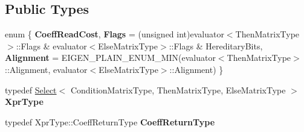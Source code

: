 \subsection*{Public Types}
\begin{DoxyCompactItemize}
\item 
\mbox{\label{struct_eigen_1_1internal_1_1evaluator_3_01_select_3_01_condition_matrix_type_00_01_then_matrix_t0c555ecce04e199df0b1ebada3749ccc_a7ffdf9db02ba05c1f4eb03e3d3ef8279}} 
enum \{ {\bfseries Coeff\+Read\+Cost}, 
{\bfseries Flags} = (unsigned int)evaluator$<$Then\+Matrix\+Type$>$\+::Flags \& evaluator$<$Else\+Matrix\+Type$>$\+::Flags \& Hereditary\+Bits, 
{\bfseries Alignment} = E\+I\+G\+E\+N\+\_\+\+P\+L\+A\+I\+N\+\_\+\+E\+N\+U\+M\+\_\+\+M\+IN(evaluator$<$Then\+Matrix\+Type$>$\+::Alignment, evaluator$<$Else\+Matrix\+Type$>$\+::Alignment)
 \}
\item 
\mbox{\label{struct_eigen_1_1internal_1_1evaluator_3_01_select_3_01_condition_matrix_type_00_01_then_matrix_t0c555ecce04e199df0b1ebada3749ccc_a78436c5edc9cca577b62054c11c57e19}} 
typedef \mbox{\hyperlink{class_eigen_1_1_select}{Select}}$<$ Condition\+Matrix\+Type, Then\+Matrix\+Type, Else\+Matrix\+Type $>$ {\bfseries Xpr\+Type}
\item 
\mbox{\label{struct_eigen_1_1internal_1_1evaluator_3_01_select_3_01_condition_matrix_type_00_01_then_matrix_t0c555ecce04e199df0b1ebada3749ccc_a94a05fa6ddffcd5bd61ee55940770ebc}} 
typedef Xpr\+Type\+::\+Coeff\+Return\+Type {\bfseries Coeff\+Return\+Type}
\end{DoxyCompactItemize}
